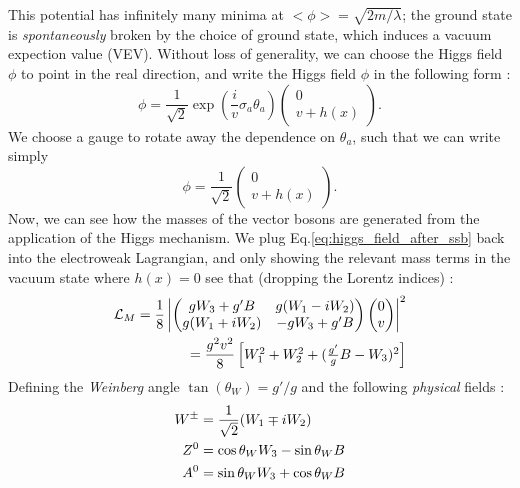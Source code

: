 This potential has infinitely many minima at $<\phi> = \sqrt{2m/\lambda}$; the ground state is \textit{spontaneously} broken by the choice of ground state, which induces a vacuum expection value (VEV).
Without loss of generality, we can choose the Higgs field $\phi$ to point in the real direction, and write the Higgs field $\phi$ in the following form :
\begin{equation}
\phi = \frac{1}{\sqrt{2}} \exp( \frac{i}{v} \sigma_a \theta_a ) \begin{pmatrix} 0 \\ v + h(x) \end{pmatrix}.
\end{equation}
We choose a gauge to rotate away the dependence on $\theta_a$, such that we can write simply
\begin{equation}
\label{eq:higgs_field_after_ssb}
\phi = \frac{1}{\sqrt{2}} \begin{pmatrix} 0 \\ v + h(x) \end{pmatrix}.
\end{equation}
Now, we can see how the masses of the vector bosons are generated from the application of the Higgs mechanism.
We plug Eq.\ref{eq:higgs_field_after_ssb} back into the electroweak Lagrangian, and only showing the relevant mass terms in the vacuum state where $h(x) = 0$  see that (dropping the Lorentz indices) :
\begin{align}
\mathcal{L}_M = \frac{1}{8} \begin{vmatrix} \begin{pmatrix} gW_3 + g'B & g(W_1 - iW_2)\\ g(W_1 + iW_2) & -gW_3 + g'B \end{pmatrix}  \begin{pmatrix} 0  \\ v \end{pmatrix} \end{vmatrix}^2\\ = \frac{g^2 v^2}{8} \begin{bmatrix} W_1^2 + W_2^2 + (\frac{g'}{g}B - W_3)^2 \end{bmatrix} \notag
\end{align}
Defining the \textit{Weinberg} angle $\tan(\theta_W) = g'/g$ and the following \textit{physical} fields :
\begin{align}
W^{\pm} &= \frac{1}{\sqrt{2}}(W_1 \mp iW_2) \\
Z^0 &= \cos \theta_W W_3 - \sin\theta_W B \notag\\
A^0 &= \sin \theta_W W_3 + \cos\theta_W B \notag
\end{align}
